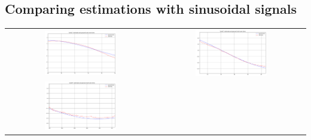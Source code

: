 \subsection{Comparing estimations with sinusoidal signals}
\begin{tabular}{c c}
    \includegraphics[width=0.5\textwidth]{plots/q2_1_j2_10sec.png} &
    \includegraphics[width=0.5\textwidth]{plots/q2_1_j3_10sec.png} \\
    \includegraphics[width=0.5\textwidth]{plots/q2_1_j4_10sec.png} &
\end{tabular}

